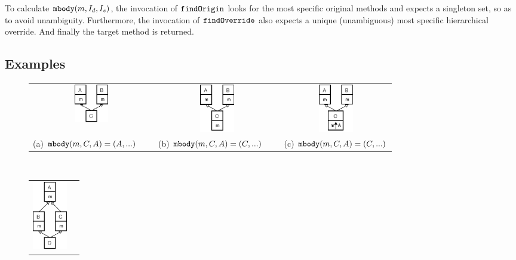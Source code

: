 To calculate $\texttt{mbody}(m, I_d, I_s)$, the invocation of $\texttt{findOrigin}$ looks for the most specific original methods and expects a singleton set, so as to avoid unambiguity. Furthermore, the invocation of $\texttt{findOverride}$ also expects a unique (unambiguous) most specific hierarchical override. And finally the target method is returned.

\subsection{Examples}

\begin{figure}[t]
	\centering
	\vspace{-1ex}
	\begin{tabular}{ccc}
		\includegraphics[width=1.5cm]{pics/P1.pdf}\hspace{4pt} &
		\includegraphics[width=1.5cm]{pics/P2.pdf}\hspace{4pt} &
		\includegraphics[width=1.5cm]{pics/P3.pdf}\hspace{4pt} \\
		(a) $\texttt{mbody}(m,C,A) = (A,...)$\ \ \  & (b) $\texttt{mbody}(m,C,A) = (C,...)$\ \ \  & (c) $\texttt{mbody}(m,C,A) = (C,...)$
	\end{tabular} \\
	\begin{tabular}{cc}
		\includegraphics[height=3cm]{pics/P4.pdf}\hspace{4pt} &

\end{tabular}
\end{figure}
